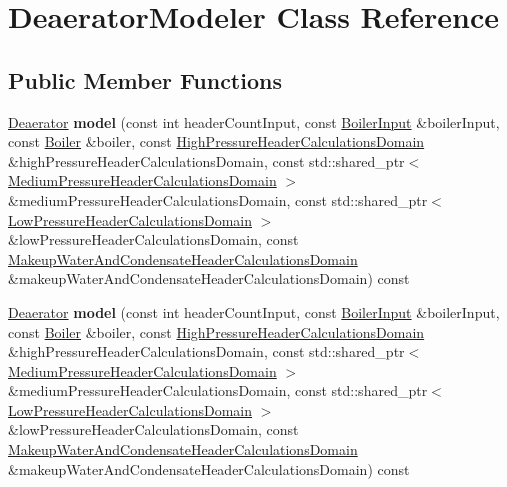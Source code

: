 \hypertarget{class_deaerator_modeler}{}\section{Deaerator\+Modeler Class Reference}
\label{class_deaerator_modeler}
\subsection*{Public Member Functions}
\begin{DoxyCompactItemize}
\item 
\mbox{\label{class_deaerator_modeler_ad486a9883b3107662101bb5ae7580581}} 
\hyperlink{class_deaerator}{Deaerator} {\bfseries model} (const int header\+Count\+Input, const \hyperlink{class_boiler_input}{Boiler\+Input} \&boiler\+Input, const \hyperlink{class_boiler}{Boiler} \&boiler, const \hyperlink{class_high_pressure_header_calculations_domain}{High\+Pressure\+Header\+Calculations\+Domain} \&high\+Pressure\+Header\+Calculations\+Domain, const std\+::shared\+\_\+ptr$<$ \hyperlink{class_medium_pressure_header_calculations_domain}{Medium\+Pressure\+Header\+Calculations\+Domain} $>$ \&medium\+Pressure\+Header\+Calculations\+Domain, const std\+::shared\+\_\+ptr$<$ \hyperlink{class_low_pressure_header_calculations_domain}{Low\+Pressure\+Header\+Calculations\+Domain} $>$ \&low\+Pressure\+Header\+Calculations\+Domain, const \hyperlink{class_makeup_water_and_condensate_header_calculations_domain}{Makeup\+Water\+And\+Condensate\+Header\+Calculations\+Domain} \&makeup\+Water\+And\+Condensate\+Header\+Calculations\+Domain) const
\item 
\mbox{\label{class_deaerator_modeler_ad486a9883b3107662101bb5ae7580581}} 
\hyperlink{class_deaerator}{Deaerator} {\bfseries model} (const int header\+Count\+Input, const \hyperlink{class_boiler_input}{Boiler\+Input} \&boiler\+Input, const \hyperlink{class_boiler}{Boiler} \&boiler, const \hyperlink{class_high_pressure_header_calculations_domain}{High\+Pressure\+Header\+Calculations\+Domain} \&high\+Pressure\+Header\+Calculations\+Domain, const std\+::shared\+\_\+ptr$<$ \hyperlink{class_medium_pressure_header_calculations_domain}{Medium\+Pressure\+Header\+Calculations\+Domain} $>$ \&medium\+Pressure\+Header\+Calculations\+Domain, const std\+::shared\+\_\+ptr$<$ \hyperlink{class_low_pressure_header_calculations_domain}{Low\+Pressure\+Header\+Calculations\+Domain} $>$ \&low\+Pressure\+Header\+Calculations\+Domain, const \hyperlink{class_makeup_water_and_condensate_header_calculations_domain}{Makeup\+Water\+And\+Condensate\+Header\+Calculations\+Domain} \&makeup\+Water\+And\+Condensate\+Header\+Calculations\+Domain) const

\end{DoxyCompactItemize}
